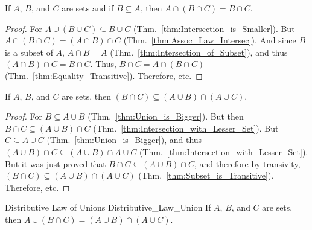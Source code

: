             \begin{theorem}
                \label{thm:Redundant_Intersection}%
                If $A$, $B$, and $C$ are sets and if
                $B\subseteq{A}$, then
                $A\cap(B\cap{C})=B\cap{C}$.
            \end{theorem}
            \begin{proof}
                For $A\cup(B\cup{C})\subseteq{B}\cup{C}$
                (Thm.~\ref{thm:Intersection_is_Smaller}). But
                $A\cap(B\cap{C})=(A\cap{B})\cap{C}$
                (Thm.~\ref{thm:Assoc_Law_Intersec}).
                And since $B$ is a subset of $A$,
                $A\cap{B}=A$
                (Thm.~\ref{thm:Intersection_of_Subset}),
                and thus $(A\cap{B})\cap{C}=B\cap{C}$. Thus,
                $B\cap{C}=A\cap(B\cap{C})$
                (Thm.~\ref{thm:Equality_Transitive}).
                Therefore, etc.
            \end{proof}
            \begin{theorem}
                \label{thm:First_Pseudo_Dist_Law_Union}%
                If $A$, $B$, and $C$ are sets, then
                $(B\cap{C})\subseteq(A\cup{B})\cap(A\cup{C})$.
            \end{theorem}
            \begin{proof}
                For $B\subseteq{A}\cup{B}$
                (Thm.~\ref{thm:Union_is_Bigger}). But then
                $B\cap{C}\subseteq(A\cup{B})\cap{C}$
                (Thm.~\ref{thm:Intersection_with_Lesser_Set}).
                But $C\subseteq{A}\cup{C}$
                (Thm.~\ref{thm:Union_is_Bigger}), and thus
                $(A\cup{B})\cap{C}%
                 \subseteq(A\cup{B})\cap{A}\cup{C}$
                (Thm.~\ref{thm:Intersection_with_Lesser_Set}).
                But it was just proved that
                $B\cap{C}\subseteq(A\cup{B})\cap{C}$, and
                therefore by transivity,
                $(B\cap{C})\subseteq(A\cup{B})\cap(A\cup{C})$
                (Thm.~\ref{thm:Subset_is_Transitive}).
                Therefore, etc.
            \end{proof}
            \newpage
            \begin{ltheorem}{Distributive Law of Unions}
                  {Distributive_Law_Union}
                If $A$, $B$, and $C$ are sets, then
                $A\cup(B\cap{C})=(A\cup{B})\cap(A\cup{C})$.
            \end{ltheorem}
